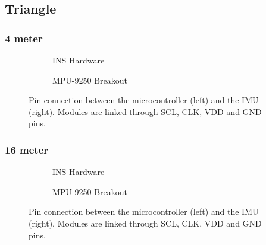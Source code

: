 \subsection{Triangle}

\subsubsection{4 meter}

\begin{figure}[!h]
    \centering
    
\end{figure}

\begin{figure}[!h]
    \centering
    \begin{subfigure}{0.49\textwidth}
        \centering
        \resizebox{1\linewidth}{!}{}
        \caption{INS Hardware}
        \label{fig:triangle4_2D}
    \end{subfigure}
    \begin{subfigure}{0.49\textwidth}
        \centering
        \resizebox{1\linewidth}{!}{}
        \caption{MPU-9250 Breakout}
        \label{fig:triangle4_3D}
    \end{subfigure}
    \caption{Pin connection between the microcontroller (left) and the IMU (right). Modules are linked through SCL, CLK, VDD and GND pins.}
    \label{fig:triangle4}
\end{figure}

\subsubsection{16 meter}

\begin{figure}[!h]
    \centering
    
\end{figure}

\begin{figure}[!h]
    \centering
    \begin{subfigure}{0.49\textwidth}
        \centering
        \resizebox{1\linewidth}{!}{}
        \caption{INS Hardware}
        \label{fig:triangle16_2D}
    \end{subfigure}
    \begin{subfigure}{0.49\textwidth}
        \centering
        \resizebox{1\linewidth}{!}{}
        \caption{MPU-9250 Breakout}
        \label{fig:triangle16_3D}
    \end{subfigure}
    \caption{Pin connection between the microcontroller (left) and the IMU (right). Modules are linked through SCL, CLK, VDD and GND pins.}
    \label{fig:triangle16}
\end{figure}

